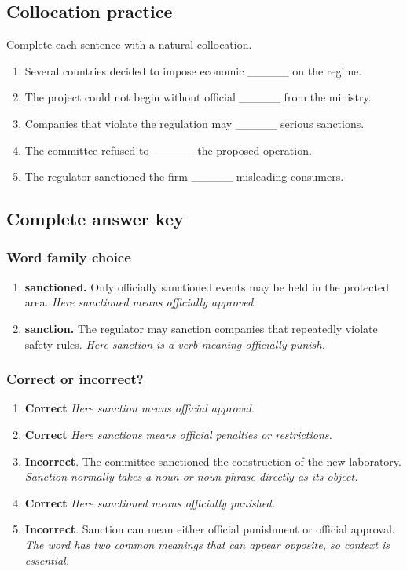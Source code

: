 \documentclass[11pt]{article}
\begin{document}
\subsection{Collocation practice}
Complete each sentence with a natural collocation.

\begin{enumerate}
  \item Several countries decided to impose economic \_\_\_\_\_ on the regime.
  \item The project could not begin without official \_\_\_\_\_ from the ministry.
  \item Companies that violate the regulation may \_\_\_\_\_ serious sanctions.
  \item The committee refused to \_\_\_\_\_ the proposed operation.
  \item The regulator sanctioned the firm \_\_\_\_\_ misleading consumers.
\end{enumerate}

\subsection{Complete answer key}
\subsubsection{Word family choice}
\begin{enumerate}
  \item \textbf{sanctioned.} Only officially sanctioned events may be held in the protected area. \emph{Here sanctioned means officially approved.}
  \item \textbf{sanction.} The regulator may sanction companies that repeatedly violate safety rules. \emph{Here sanction is a verb meaning officially punish.}
\end{enumerate}

\subsubsection{Correct or incorrect?}
\begin{enumerate}
  \item \textbf{Correct} \emph{Here sanction means official approval.}
  \item \textbf{Correct} \emph{Here sanctions means official penalties or restrictions.}
  \item \textbf{Incorrect}. The committee sanctioned the construction of the new laboratory. \emph{Sanction normally takes a noun or noun phrase directly as its object.}
  \item \textbf{Correct} \emph{Here sanctioned means officially punished.}
  \item \textbf{Incorrect}. Sanction can mean either official punishment or official approval. \emph{The word has two common meanings that can appear opposite, so context is essential.}
\end{enumerate}
\end{document}
